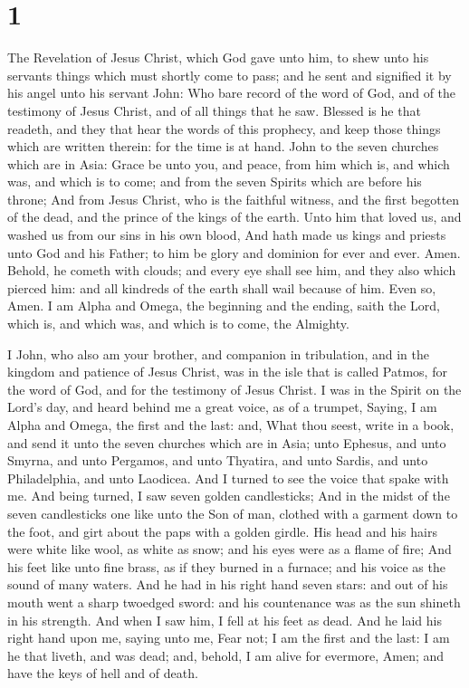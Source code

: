 \hypertarget{section}{%
\section{1}\label{section}}

 The Revelation of Jesus Christ, which God gave unto him, to
shew unto his servants things which must shortly come to pass; and he
sent and signified it by his angel unto his servant John: 
Who bare record of the word of God, and of the testimony of Jesus
Christ, and of all things that he saw.  Blessed is he that
readeth, and they that hear the words of this prophecy, and keep those
things which are written therein: for the time is at hand. 
John to the seven churches which are in Asia: Grace be unto you, and
peace, from him which is, and which was, and which is to come; and from
the seven Spirits which are before his throne;  And from
Jesus Christ, who is the faithful witness, and the first begotten of the
dead, and the prince of the kings of the earth. Unto him that loved us,
and washed us from our sins in his own blood,  And hath made
us kings and priests unto God and his Father; to him be glory and
dominion for ever and ever. Amen.  Behold, he cometh with
clouds; and every eye shall see him, and they also which pierced him:
and all kindreds of the earth shall wail because of him. Even so, Amen.
 I am Alpha and Omega, the beginning and the ending, saith
the Lord, which is, and which was, and which is to come, the Almighty.

 I John, who also am your brother, and companion in
tribulation, and in the kingdom and patience of Jesus Christ, was in the
isle that is called Patmos, for the word of God, and for the testimony
of Jesus Christ.  I was in the Spirit on the Lord's day,
and heard behind me a great voice, as of a trumpet, 
Saying, I am Alpha and Omega, the first and the last: and, What thou
seest, write in a book, and send it unto the seven churches which are in
Asia; unto Ephesus, and unto Smyrna, and unto Pergamos, and unto
Thyatira, and unto Sardis, and unto Philadelphia, and unto Laodicea.
 And I turned to see the voice that spake with me. And
being turned, I saw seven golden candlesticks;  And in the
midst of the seven candlesticks one like unto the Son of man, clothed
with a garment down to the foot, and girt about the paps with a golden
girdle.  His head and his hairs were white like wool, as
white as snow; and his eyes were as a flame of fire;  And
his feet like unto fine brass, as if they burned in a furnace; and his
voice as the sound of many waters.  And he had in his right
hand seven stars: and out of his mouth went a sharp twoedged sword: and
his countenance was as the sun shineth in his strength. 
And when I saw him, I fell at his feet as dead. And he laid his right
hand upon me, saying unto me, Fear not; I am the first and the last:
 I am he that liveth, and was dead; and, behold, I am alive
for evermore, Amen; and have the keys of hell and of death.

